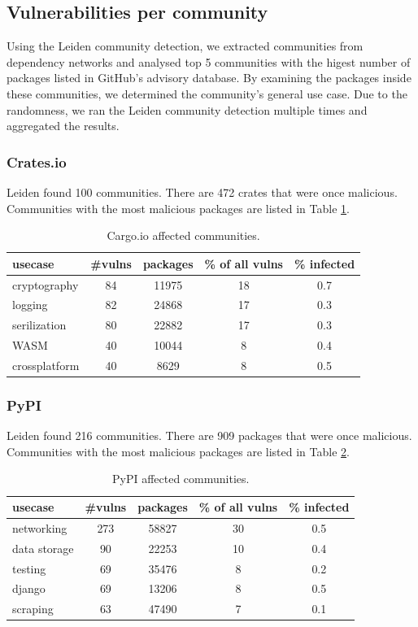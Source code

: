 \documentclass[9pt,twocolumn,twoside]{pnas-report}
\begin{document}
\subsection*{Vulnerabilities per community}
Using the Leiden community detection, we extracted communities from dependency networks and analysed top 5 communities with the higest number of packages listed in GitHub's advisory database.
By examining the packages inside these communities, we determined the community's general use case.
Due to the randomness, we ran the Leiden community detection multiple times and aggregated the results.

\subsubsection*{Crates.io}
Leiden found 100 communities. There are 472 crates that were once malicious. Communities with the most malicious packages are listed in Table \ref{tab:cargo_comms}.
\begin{table}[h]\centering%
	\caption{Cargo.io affected communities.}
	\begin{tabular}{l|cccc}
		usecase       & \#vulns & packages & \% of all vulns & \% infected \\\hline
		cryptography  & 84      & 11975    & 18              & 0.7         \\
		logging       & 82      & 24868    & 17              & 0.3         \\
		serilization  & 80      & 22882    & 17              & 0.3         \\
		WASM          & 40      & 10044    & 8               & 0.4         \\
		crossplatform & 40      & 8629     & 8               & 0.5         \\
	\end{tabular}
	\label{tab:cargo_comms}
\end{table}
\subsubsection*{PyPI}
Leiden found 216 communities. There are 909 packages that were once malicious. Communities with the most malicious packages are listed in Table \ref{tab:pypi_comms}.
\begin{table}[h]\centering%
	\caption{PyPI affected communities.}
	\begin{tabular}{l|cccc}
		usecase      & \#vulns & packages & \% of all vulns & \% infected \\\hline
		networking   & 273     & 58827    & 30              & 0.5         \\
		data storage & 90      & 22253    & 10              & 0.4         \\
		testing      & 69      & 35476    & 8               & 0.2         \\
		django       & 69      & 13206    & 8               & 0.5         \\
		scraping     & 63      & 47490    & 7               & 0.1         \\
	\end{tabular}
	\label{tab:pypi_comms}
\end{table}
\end{document}
